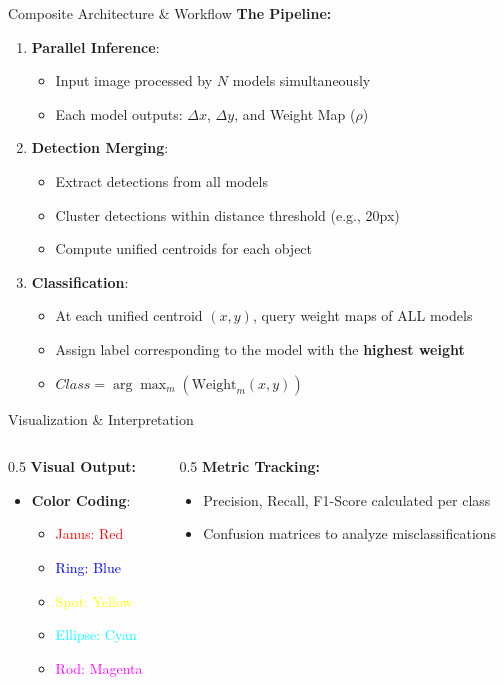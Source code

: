 \begin{frame}{Composite Architecture \& Workflow}
\textbf{The Pipeline:}
\begin{enumerate}
    \item \textbf{Parallel Inference}: 
    \begin{itemize}
        \item Input image processed by $N$ models simultaneously
        \item Each model outputs: $\Delta x$, $\Delta y$, and Weight Map ($\rho$)
    \end{itemize}
    \item \textbf{Detection Merging}:
    \begin{itemize}
        \item Extract detections from all models
        \item Cluster detections within distance threshold (e.g., 20px)
        \item Compute unified centroids for each object
    \end{itemize}
    \item \textbf{Classification}:
    \begin{itemize}
        \item At each unified centroid $(x, y)$, query weight maps of ALL models
        \item Assign label corresponding to the model with the \textbf{highest weight}
        \item $Class = \arg\max_{m} (\text{Weight}_m(x,y))$
    \end{itemize}
\end{enumerate}
\end{frame}

\begin{frame}{Visualization \& Interpretation}
\begin{columns}
\begin{column}{0.5\textwidth}
\textbf{Visual Output:}
\begin{itemize}
    \item \textbf{Color Coding}:
    \begin{itemize}
        \item \textcolor{red}{Janus: Red}
        \item \textcolor{blue}{Ring: Blue}
        \item \textcolor{yellow}{Spot: Yellow}
        \item \textcolor{cyan}{Ellipse: Cyan}
        \item \textcolor{magenta}{Rod: Magenta}
    \end{itemize}
\end{itemize}
\end{column}
\begin{column}{0.5\textwidth}
\textbf{Metric Tracking:}
\begin{itemize}
    \item Precision, Recall, F1-Score calculated per class
    \item Confusion matrices to analyze misclassifications
\end{itemize}
\end{column}
\end{columns}
\end{frame}

